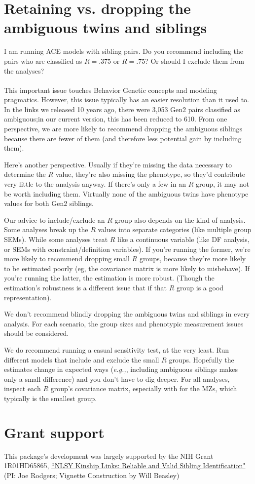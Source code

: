 \documentclass{article}\usepackage[]{graphicx}\usepackage[]{color}
\begin{document}
\section{Retaining vs. dropping the ambiguous twins and siblings}
\textsf{I am running ACE models with sibling pairs.  Do you recommend including the pairs who are classified as $R=.375$ or $R=.75$?  Or should I exclude them from the analyses?}\\ \\
This important issue touches Behavior Genetic concepts and modeling pragmatics.  However, this issue typically has an easier resolution than it used to.  In the links we released 10 years ago, there were 3,053 Gen2 pairs classified as ambiguous;in our current version, this has been reduced to 610.  From one perspective, we are more likely to recommend dropping the ambiguous siblings because there are fewer of them (and therefore less potential gain by including them).

Here's another perspective.  Usually if they're missing the data necessary to determine the $R$ value, they're also missing the phenotype, so they'd contribute very little to the analysis anyway.  If there's only a few in an $R$ group, it may not be worth including them.  Virtually none of the ambiguous twins have phenotype values for both Gen2 siblings.

Our advice to include/exclude an $R$ group also depends on the kind of analysis.  Some analyses break up the $R$ values into separate categories (like multiple group SEMs).  While some analyses treat $R$ like a continuous variable (like DF analysis, or SEMs with constraint/definition variables).  If you're running the former, we're more likely to recommend dropping small $R$ groups, because they're more likely to be estimated poorly (eg, the covariance matrix is more likely to misbehave).  If you're running the latter, the estimation is more robust.  (Though the estimation's robustness is a different issue that if that $R$ group is a good representation).

We don't recommend blindly dropping the ambiguous twins and siblings in every analysis.  For each scenario, the group sizes and phenotypic measurement issues should be considered.

We do recommend running a casual sensitivity test, at the very least.  Run different models that include and exclude the small $R$ groups.  Hopefully the estimates change in expected ways (\emph{e.g.,}, including ambiguous siblings makes only a small difference)  and you don't have to dig deeper.  For all analyses, inspect each $R$ group's covariance matrix, especially with for the MZs, which typically is the smallest group. 


\section{Grant support}
This package's development was largely supported by the NIH Grant 1R01HD65865,  \href{http://taggs.hhs.gov/AwardDetail.cfm?s_Award_Num=R01HD065865&n_Prog_Office_Code=50}{``NLSY Kinship Links: Reliable and Valid Sibling Identification"} (PI: Joe Rodgers; Vignette Construction by Will Beasley)
\end{document}
